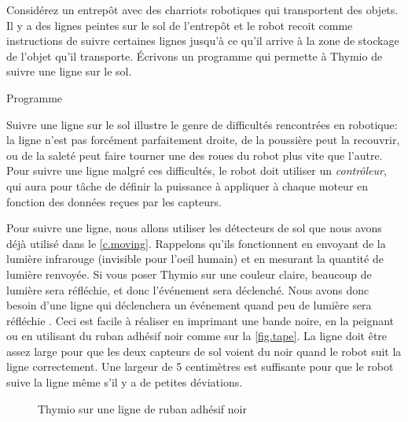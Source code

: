 \label{ch.line}

Considérez un entrepôt avec des charriots robotiques qui transportent des objets.
Il y a des lignes peintes sur le sol de l'entrepôt et le robot recoit comme instructions de suivre certaines lignes jusqu'à ce qu'il arrive à la zone de stockage de l'objet qu'il transporte.
Écrivons un programme qui permette à Thymio de suivre une ligne sur le sol.

{\raggedleft \hfill Programme }

Suivre une ligne sur le sol illustre le genre de difficultés rencontrées en robotique:
la ligne n'est pas forcément parfaitement droite,
de la poussière peut la recouvrir, ou de la saleté peut faire tourner une des roues du robot plus vite que l'autre.
Pour suivre une ligne malgré ces difficultés,
le robot doit utiliser un \emph{contrôleur}, qui aura pour tâche de définir la puissance à appliquer à chaque moteur en fonction des données reçues par les capteurs.


Pour suivre une ligne, nous allons utiliser les détecteurs de sol que nous avons déjà utilisé dans le \cref{c.moving}.
Rappelons qu'ils fonctionnent en envoyant de la lumière infrarouge (invisible pour l'oeil humain) et en mesurant la quantité de lumière renvoyée.
Si vous poser Thymio sur une couleur claire, beaucoup de lumière sera réfléchie, et donc l'événement  sera déclenché.
Nous avons donc besoin d'une ligne qui déclenchera un événement quand peu de lumière sera réfléchie .
Ceci est facile à réaliser en imprimant une bande noire, en la peignant ou en utilisant du ruban adhésif noir comme sur la \cref{fig.tape}.
La ligne doit être assez large pour que les deux capteurs de sol voient du noir quand le robot suit la ligne correctement.
Une largeur de 5 centimètres est suffisante pour que le robot suive la ligne même s'il y a de petites déviations.

\begin{figure}
    \hfill
    \caption{Thymio sur une ligne de ruban adhésif noir}
\end{figure}


